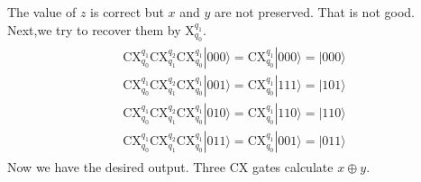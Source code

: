 \documentclass[letterpaper,10pt,english]{jupyterBook}
\begin{document}
\sphinxAtStartPar
The value of \(z\) is correct but \(x\) and \(y\) are not preserved.  That is not good. Next,we try to recover them by
X\(_{q_0}^{q_1}\).
\begin{equation*}
\begin{split}
\begin{align}
\text{CX}_{q_0}^{q_1} \text{CX}_{q_1}^{q_2}\text{CX}_{q_0}^{q_1}|000\rangle = \text{CX}_{q_0}^{q_1}|000\rangle = |000\rangle  \\
\text{CX}_{q_0}^{q_1} \text{CX}_{q_1}^{q_2}\text{CX}_{q_0}^{q_1}|001\rangle = \text{CX}_{q_0}^{q_1}|111\rangle = |101\rangle \\
\text{CX}_{q_0}^{q_1} \text{CX}_{q_1}^{q_2}\text{CX}_{q_0}^{q_1}|010\rangle = \text{CX}_{q_0}^{q_1}|110\rangle = |110\rangle \\
\text{CX}_{q_0}^{q_1} \text{CX}_{q_1}^{q_2}\text{CX}_{q_0}^{q_1}|011\rangle = \text{CX}_{q_0}^{q_1}|001\rangle =|011\rangle
\end{align}
\end{split}
\end{equation*}
\sphinxAtStartPar
Now we have the desired output.  Three CX gates calculate \(x \oplus y\).
\end{document}
